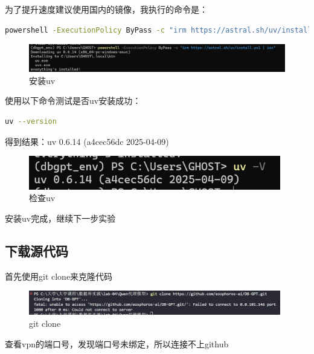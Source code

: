 \documentclass{article}
\begin{document}
	为了提升速度建议使用国内的镜像，我执行的命令是：
	
	\begin{lstlisting}[language=bash, title=uv安装, tabsize=4]
	powershell -ExecutionPolicy ByPass -c "irm https://astral.sh/uv/install.ps1 | iex"
	\end{lstlisting}
	
	\begin{figure}[H]
		\centering
		\includegraphics[width=13cm]{./images/5.安装uv.png}
		\caption{安装uv}
	\end{figure}
	
	使用以下命令测试是否uv安装成功：
	
	\begin{lstlisting}[language=bash, title=uv安装, tabsize=4]
		uv --version
	\end{lstlisting}
	
	得到结果：uv 0.6.14 (a4cec56dc 2025-04-09)
	
	\begin{figure}[H]
		\centering
		\includegraphics[width=11cm]{./images/6.检查uv.png}
		\caption{检查uv}
	\end{figure}
	
	安装uv完成，继续下一步实验
	
	\subsection{下载源代码}
	
	首先使用git clone来克隆代码
	
	\begin{figure}[H]
		\centering
		\includegraphics[width=11cm]{./images/7.git clone.png}
		\caption{git clone}
	\end{figure}
	
	查看vpn的端口号，发现端口号未绑定，所以连接不上github
	
\end{document}
